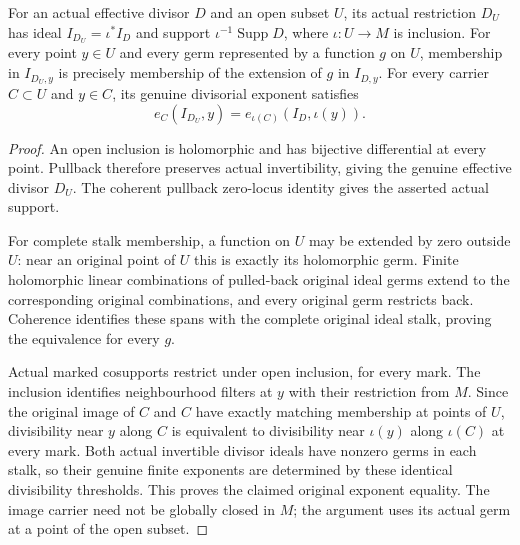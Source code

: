 \begin{lemma}
\label{hir:actual-divisor-open-germ-exponent-dictionary}
\leanok
For an actual effective divisor $D$ and an open subset $U$, its actual
restriction $D_U$ has ideal $I_{D_U}=\iota^*I_D$ and support
$\iota^{-1}\operatorname{Supp}D$, where $\iota:U\to M$ is inclusion.
For every point $y\in U$ and every germ represented by a function $g$
on $U$, membership in $I_{D_U,y}$ is precisely membership of the
extension of $g$ in $I_{D,y}$.  For every carrier $C\subset U$ and
$y\in C$, its genuine divisorial exponent satisfies
\[
 e_C(I_{D_U},y)=e_{\iota(C)}(I_D,\iota(y)).
\]
\end{lemma}
\begin{proof}
An open inclusion is holomorphic and has bijective differential at
every point.  Pullback therefore preserves actual invertibility,
giving the genuine effective divisor $D_U$.  The coherent pullback
zero-locus identity gives the asserted actual support.

For complete stalk membership, a function on $U$ may be extended by
zero outside $U$: near an original point of $U$ this is exactly its
holomorphic germ.  Finite holomorphic linear combinations of pulled-back
original ideal germs extend to the corresponding original combinations,
and every original germ restricts back.  Coherence identifies these
spans with the complete original ideal stalk, proving the equivalence
for every $g$.

Actual marked cosupports restrict under open inclusion, for every mark.
The inclusion identifies neighbourhood filters at $y$ with their
restriction from $M$.  Since the original image of $C$ and $C$ have
exactly matching membership at points of $U$, divisibility near $y$
along $C$ is equivalent to divisibility near $\iota(y)$ along
$\iota(C)$ at every mark.  Both actual invertible divisor ideals have
nonzero germs in each stalk, so their genuine finite exponents are
determined by these identical divisibility thresholds.  This proves
the claimed original exponent equality.  The image carrier need not
be globally closed in $M$; the argument uses its actual germ at a point
of the open subset.
\end{proof}

